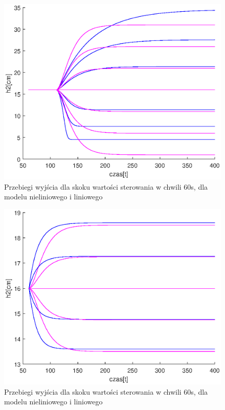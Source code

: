 		\begin{figure}
			\includegraphics[width=0.9\linewidth]{plots/z1_modellin_u.eps}
			\caption{Przebiegi wyjścia dla skoku wartości sterowania w chwili 60s, dla modelu nieliniowego i liniowego}
			\label{rys:modellin_u}
		\end{figure}
		\begin{figure}
			\includegraphics[width=0.9\linewidth]{plots/z1_modellin_z.eps}
			\caption{Przebiegi wyjścia dla skoku wartości sterowania w chwili 60s, dla modelu nieliniowego i liniowego}
			\label{rys:modellin_z}
		\end{figure}
		\newpage